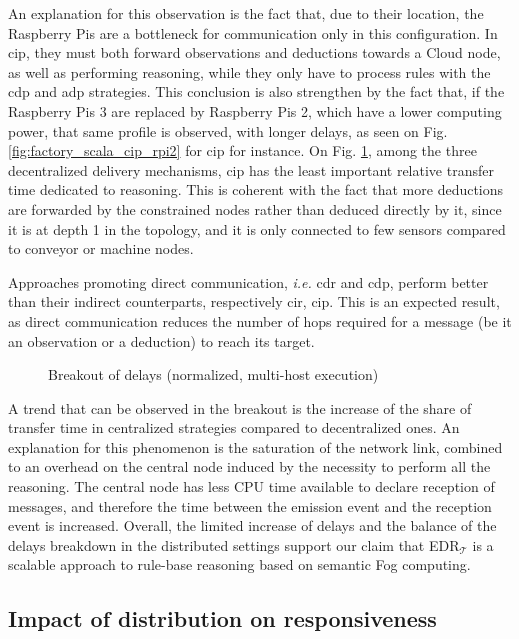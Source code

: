 \documentclass{iosart2c}
\newcommand{\edrt}{EDR$_{\mathcal{T}}$\xspace}
\begin{document}
An explanation for this observation is the fact that, due to their location, the Raspberry Pis are a bottleneck for communication only in this configuration. 
In \gls{cip}, they must both forward observations and deductions towards a Cloud node, as well as performing reasoning, while they only have to process rules with the \gls{cdp} and \gls{adp} strategies.
This conclusion is also strengthen by the fact that, if the Raspberry Pis 3 are replaced by Raspberry Pis 2, which have a lower computing power, that same profile is observed, with longer delays, as seen on Fig. \ref{fig:factory_scala_cip_rpi2} for \gls{cip} for instance.
On Fig. \ref{fig:breakout_delays_rpi}, among the three decentralized delivery mechanisms, \gls{cip} has the least important relative transfer time dedicated to reasoning.
This is coherent with the fact that more deductions are forwarded by the constrained nodes rather than deduced directly by it, since it is at depth 1 in the topology, and it is only connected to few sensors compared to conveyor or machine nodes.

Approaches promoting direct communication, \textit{i.e.} \gls{cdr} and \gls{cdp}, perform better than their indirect counterparts, respectively \gls{cir}, \gls{cip}.
This is an expected result, as direct communication reduces the number of hops required for a message (be it an observation or a deduction) to reach its target.

\begin{figure}
	\caption{Breakout of delays (normalized, multi-host execution)}
	\label{fig:breakout_delays_rpi}
	\scalebox{0.75}{
		
	}
\end{figure}

A trend that can be observed in the breakout is the increase of the share of transfer time in centralized strategies compared to decentralized ones. 
An explanation for this phenomenon is the saturation of the network link, combined to an overhead on the central node induced by the necessity to perform all the reasoning. 
The central node has less CPU time available to declare reception of messages, and therefore the time between the emission event and the reception event is increased.
Overall, the limited increase of delays and the balance of the delays breakdown in the distributed settings support our claim that \edrt is a scalable approach to rule-base reasoning based on semantic Fog computing.

\subsection{Impact of distribution on responsiveness}
\label{subs:factory_distribution}
\end{document}

